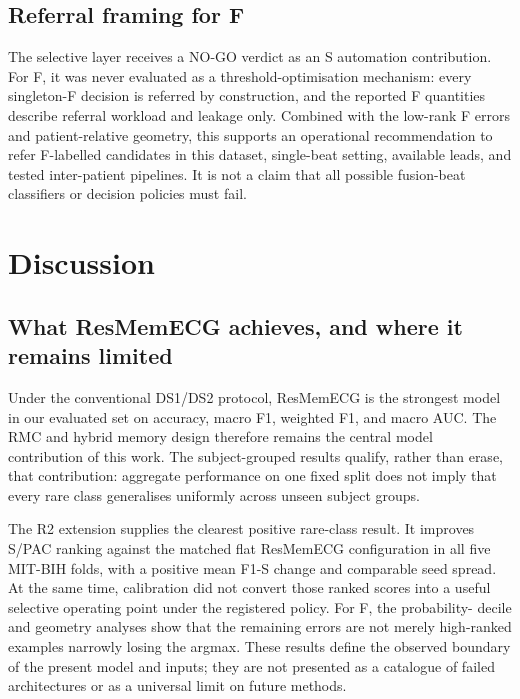 \documentclass[pdflatex,sn-mathphys-num]{sn-jnl}
\begin{document}
\subsection{Referral framing for F}
The selective layer receives a NO-GO verdict as an S automation contribution.
For F, it was never evaluated as a threshold-optimisation mechanism: every
singleton-F decision is referred by construction, and the reported F quantities
describe referral workload and leakage only. Combined with the low-rank F errors
and patient-relative geometry, this supports an operational recommendation to
refer F-labelled candidates in this dataset, single-beat setting, available
leads, and tested inter-patient pipelines. It is not a claim that all possible
fusion-beat classifiers or decision policies must fail.
\section{Discussion}
\subsection{What ResMemECG achieves, and where it remains limited}
Under the conventional DS1/DS2 protocol, ResMemECG is the strongest model in
our evaluated set on accuracy, macro F1, weighted F1, and macro AUC. The RMC and
hybrid memory design therefore remains the central model contribution of this
work. The subject-grouped results qualify, rather than erase, that contribution:
aggregate performance on one fixed split does not imply that every rare class
generalises uniformly across unseen subject groups.

The R2 extension supplies the clearest positive rare-class result. It improves
S/PAC ranking against the matched flat ResMemECG configuration in all five
MIT-BIH folds, with a positive mean F1-S change and comparable seed spread. At
the same time, calibration did not convert those ranked scores into a useful
selective operating point under the registered policy. For F, the probability-
decile and geometry analyses show that the remaining errors are not merely
high-ranked examples narrowly losing the argmax. These results define the
observed boundary of the present model and inputs; they are not presented as a
catalogue of failed architectures or as a universal limit on future methods.
\end{document}
